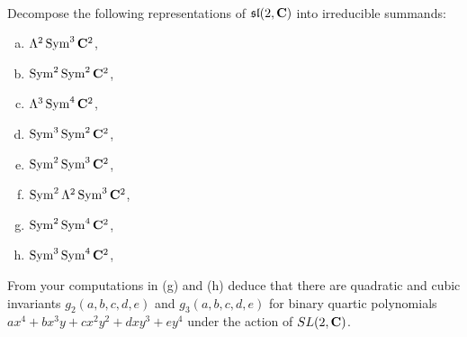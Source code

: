 \documentclass[12pt]{article}
\begin{document}
\begin{question}\ \\
Decompose the following representations of $\mathfrak{sl}(2,\mathbf{C})$ into irreducible summands:
\begin{multicols}{2}
\begin{enumerate}[(a)]
\item $\Lambda^2\operatorname{Sym}^3\mathbf{C}^2$,
\item $\operatorname{Sym}^2\operatorname{Sym}^2\mathbf{C}^2$,
\item $\Lambda^3\operatorname{Sym}^4\mathbf{C}^2$,
\item $\operatorname{Sym}^3\operatorname{Sym}^2\mathbf{C}^2$,
\item $\operatorname{Sym}^2\operatorname{Sym}^3\mathbf{C}^2$,
\item $\operatorname{Sym}^2\Lambda^2\operatorname{Sym}^3\mathbf{C}^2$,
\item $\operatorname{Sym}^2\operatorname{Sym}^4\mathbf{C}^2$,
\item $\operatorname{Sym}^3\operatorname{Sym}^4\mathbf{C}^2$,
\end{enumerate}
\end{multicols}
From your computations in (g) and (h) deduce that there are quadratic and cubic invariants $g_2(a,b,c,d,e)$ and $g_3(a,b,c,d,e)$ for binary quartic polynomials $ax^4+bx^3y+cx^2y^2+dxy^3+ey^4$ under the action of $SL(2,\mathbf{C})$.
\end{question}
\end{document}
